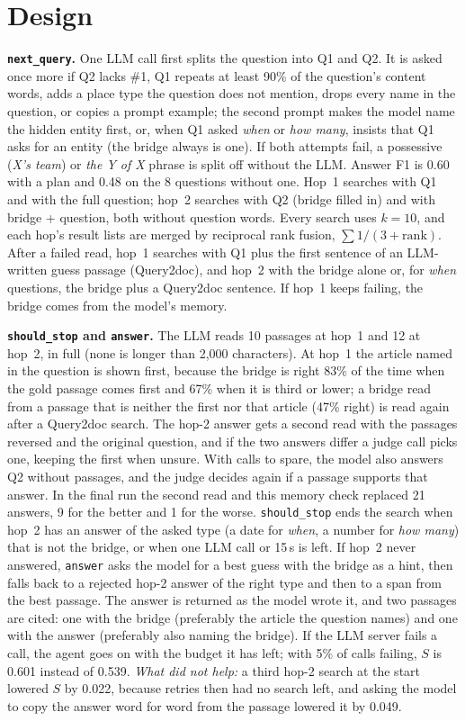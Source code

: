 \documentclass[10pt,a4paper]{article}
\begin{document}
\section{Design}
\textbf{\texttt{next\_query}.} One LLM call first splits the question into Q1 and Q2. It is asked once more if Q2
lacks \#1, Q1 repeats at least 90\% of the question's content words, adds a place type the question does not mention,
drops every name in the question, or copies a prompt example; the second prompt makes the model name the hidden
entity first, or, when Q1 asked \emph{when} or \emph{how many}, insists that Q1 asks for an entity (the bridge always
is one). If both attempts fail, a possessive (\emph{X's team}) or \emph{the Y of X} phrase is split off without the
LLM. Answer F1 is 0.60 with a plan and 0.48 on the 8 questions without one. Hop~1 searches with Q1 and with the full
question; hop~2 searches with Q2 (bridge filled in) and with bridge + question, both without question words. Every
search uses $k{=}10$, and each hop's result lists are merged by reciprocal rank fusion, $\sum 1/(3+\mathrm{rank})$.
After a failed read, hop~1 searches with Q1 plus the first sentence of an LLM-written guess passage (Query2doc), and
hop~2 with the bridge alone or, for \emph{when} questions, the bridge plus a Query2doc sentence. If hop~1 keeps
failing, the bridge comes from the model's memory.

\textbf{\texttt{should\_stop} and \texttt{answer}.} The LLM reads 10 passages at hop~1 and 12 at hop~2, in full
(none is longer than 2,000 characters). At hop~1 the article named in the question is shown first, because the
bridge is right 83\% of the time when the gold passage comes first and 67\% when it is third or lower; a bridge read
from a passage that is neither the first nor that article (47\% right) is read again after a Query2doc search. The
hop-2 answer gets a second read with the passages reversed and the original question, and if the two answers differ
a judge call picks one, keeping the first when unsure. With calls to spare, the model also answers Q2 without
passages, and the judge decides again if a passage supports that answer. In the final run the second read and this
memory check replaced 21 answers, 9 for the better and 1 for the worse. \texttt{should\_stop} ends the search when
hop~2 has an answer of the asked type (a date for \emph{when}, a number for \emph{how many}) that is not the bridge,
or when one LLM call or 15\,s is left. If hop~2 never answered, \texttt{answer} asks the model for a best guess with
the bridge as a hint, then falls back to a rejected hop-2 answer of the right type and then to a span from the best
passage. The answer is returned as the model wrote it, and two passages are cited: one with the bridge (preferably
the article the question names) and one with the answer (preferably also naming the bridge). If the LLM server fails
a call, the agent goes on with the budget it has left; with 5\% of calls failing, $S$ is 0.601 instead of 0.539.
\emph{What did not help:} a third hop-2 search at the start lowered $S$ by 0.022, because retries then had no
search left, and asking the model to copy the answer word for word from the passage lowered it by 0.049.
\end{document}
